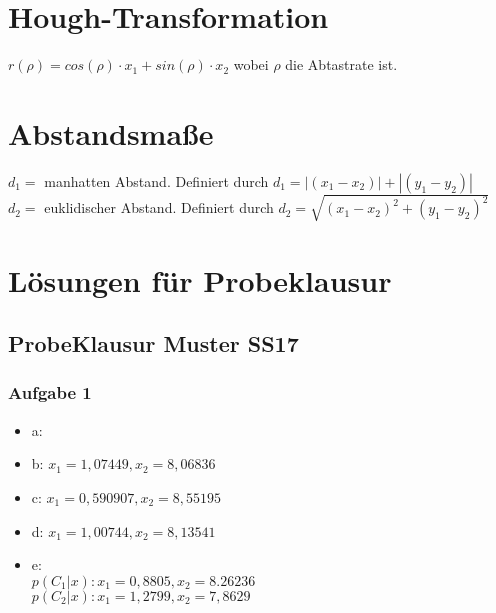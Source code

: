 \documentclass{article}
\begin{document}
\section{Hough-Transformation}

$r(\rho) = cos(\rho) \cdot x_1 + sin(\rho) \cdot x_2$
wobei $\rho$ die Abtastrate ist. 


\section{Abstandsmaße}
$d_1 =$ manhatten Abstand. Definiert durch $d_1 = |(x_1 - x_2)| + |(y_1 - y_2)|$
\\
$d_2 =$ euklidischer Abstand. Definiert durch $d_2=\sqrt{(x_1 - x_2)^2+(y_1 - y_2)^2}$
\\


\newpage
\section{Lösungen für Probeklausur}

\subsection{ProbeKlausur Muster SS17}

\subsubsection{Aufgabe 1}

\begin{itemize}
	\item a:
		
		\begin{figure}[h]
		
	\end{figure}
	
	
	\item b: $x_1 = 1,07449 , x_2 = 8,06836$
	\item c: $x_1 = 0,590907 , x_2 = 8,55195$
	\item d: $x_1 = 1,00744 , x_2 = 8,13541$
	\item e: \\$p(C_1 | x) : x_1 = 0,8805 , x_2 = 8.26236$ \\ 		$p(C_2| x) : x_1 = 1,2799 , x_2 = 7,8629$
\end{itemize}
\end{document}
